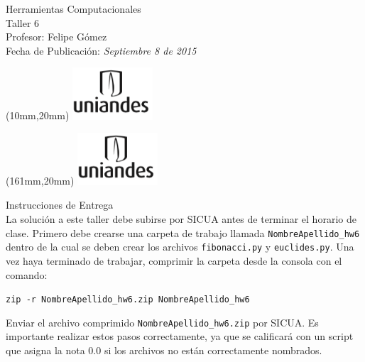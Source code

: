 \documentclass[11pt,letterpaper]{exam}
\begin{document}
\begin{center}
{\Large Herramientas Computacionales} \\
Taller 6 \\
Profesor: Felipe G\'omez\\
Fecha de Publicación: {\small \it Septiembre 8 de 2015}\\
\end{center}

\begin{textblock*}{40mm}(10mm,20mm)
  \includegraphics[width=3cm]{logoUniandes.png}
\end{textblock*}

\begin{textblock*}{40mm}(161mm,20mm)
  \includegraphics[width=3cm]{logoUniandes.png}
\end{textblock*}

\vspace{0.5cm}

{\Large Instrucciones de Entrega}\\

\noindent
La solución a este taller debe subirse por SICUA antes de terminar 
el horario de clase.
\noindent
Primero debe crearse una carpeta de trabajo llamada \verb"NombreApellido_hw6"
dentro de la cual se deben crear los archivos \verb"fibonacci.py" y
\verb"euclides.py". Una vez haya terminado de trabajar, comprimir la carpeta
desde la consola con el comando:

\verb"zip -r NombreApellido_hw6.zip NombreApellido_hw6"

\noindent Enviar el archivo comprimido \verb"NombreApellido_hw6.zip" por SICUA. 
Es importante realizar estos pasos correctamente, ya que se calificará con un
script que asigna la nota 0.0 si los archivos no están correctamente nombrados.
\end{document}
